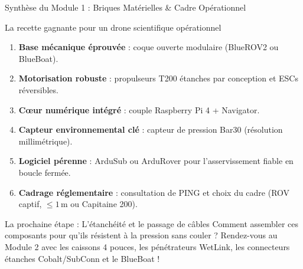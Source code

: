 \begin{frame}{Synthèse du Module 1 : Briques Matérielles \& Cadre Opérationnel}
  \begin{exampleblock}{La recette gagnante pour un drone scientifique opérationnel}
    \begin{enumerate}
      \item \textbf{Base mécanique éprouvée} : coque ouverte modulaire (BlueROV2 ou BlueBoat).
      \item \textbf{Motorisation robuste} : propulseurs T200 étanches par conception et ESCs réversibles.
      \item \textbf{C{\oe}ur numérique intégré} : couple Raspberry Pi 4 + Navigator.
      \item \textbf{Capteur environnemental clé} : capteur de pression Bar30 (résolution millimétrique).
      \item \textbf{Logiciel pérenne} : ArduSub ou ArduRover pour l'asservissement fiable en boucle fermée.
      \item \textbf{Cadrage réglementaire} : consultation de PING et choix du cadre (ROV captif, $\le 1\,\text{m}$ ou Capitaine 200).
    \end{enumerate}
  \end{exampleblock}

  \begin{alertblock}{La prochaine étape : L'étanchéité et le passage de câbles}
    Comment assembler ces composants pour qu'ils résistent à la pression sans couler ? Rendez-vous au Module 2 avec les caissons 4 pouces, les pénétrateurs WetLink, les connecteurs étanches Cobalt/SubConn et le BlueBoat !
  \end{alertblock}
\end{frame}

